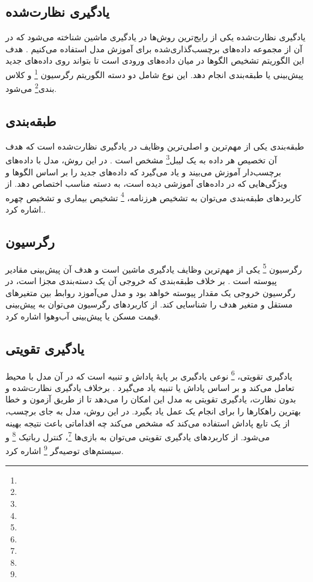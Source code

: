 \subsection{یادگیری نظارت‌شده}
یادگیری نظارت‌شده یکی از رایج‌ترین روش‌ها در یادگیری ماشین شناخته می‌شود که در آن از مجموعه داده‌های برچسب‌گذاری‌شده برای آموزش مدل استفاده می‌کنیم \cite{james2013introduction}. هدف این الگوریتم تشخیص الگوها در میان داده‌های ورودی است تا بتواند روی داده‌های جدید پیش‌بینی یا طبقه‌بندی انجام دهد. این نوع شامل دو دسته الگوریتم رگرسیون \footnote{} و کلاس بندی\footnote{} می‌شود.



\subsection{طبقه‌بندی}
طبقه‌بندی یکی از مهم‌ترین و اصلی‌ترین وظایف در یادگیری نظارت‌شده است که هدف آن تخصیص هر داده به یک لیبل\footnote{} مشخص است
\cite{bishop2006pattern}.
در این روش، مدل با داده‌های برچسب‌دار آموزش می‌بیند و یاد می‌گیرد که داده‌های جدید را بر اساس الگوها و ویژگی‌هایی که در داده‌های آموزشی دیده است، به دسته مناسب اختصاص دهد. از کاربردهای طبقه‌بندی می‌توان به تشخیص هرزنامه،
 \footnote{} تشخیص بیماری و تشخیص چهره اشاره کرد.\cite{murphy2012machine}.

\subsection{رگرسیون}
رگرسیون \footnote{} یکی از مهم‌ترین وظایف یادگیری ماشین است و هدف آن پیش‌بینی مقادیر پیوسته است
\cite{montgomery2021introduction}. بر خلاف طبقه‌بندی که خروجی آن یک دسته‌بندی مجزا است، در رگرسیون خروجی یک مقدار پیوسته خواهد بود و مدل می‌آموزد روابط بین متغیرهای مستقل و متغیر هدف را شناسایی کند. از کاربردهای رگرسیون می‌توان به پیش‌بینی قیمت مسکن یا پیش‌بینی آب‌وهوا اشاره کرد.

\subsection{یادگیری تقویتی}
یادگیری تقویتی، \footnote{} نوعی یادگیری بر پایهٔ پاداش و تنبیه است که در آن مدل با محیط تعامل می‌کند و بر اساس پاداش یا تنبیه یاد می‌گیرد
\cite{sutton2018reinforcement}.
برخلاف یادگیری نظارت‌شده و بدون نظارت، یادگیری تقویتی به مدل این امکان را می‌دهد تا از طریق آزمون و خطا بهترین راهکارها را برای انجام یک عمل یاد بگیرد. در این روش، مدل به جای برچسب، از یک تابع پاداش استفاده می‌کند که مشخص می‌کند چه اقداماتی باعث نتیجه بهینه می‌شود. از کاربردهای یادگیری تقویتی می‌توان به بازی‌ها \footnote{}، کنترل رباتیک \footnote{} و سیستم‌های توصیه‌گر \footnote{} اشاره کرد.



